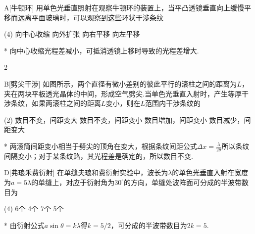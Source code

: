 \begin{choice}{A}[牛顿环]
    用单色光垂直照射在观察牛顿环的装置上，当平凸透镜垂直向上缓慢平移而远离平面玻璃时，可以观察到这些环状干涉条纹
    \begin{tasks}(4)
        \task 向中心收缩
        \task 向外扩张
        \task 向右平移
        \task 向左平移
    \end{tasks}
\end{choice}
\begin{solution}*
    向中心收缩光程差减小，可抵消透镜上移时导致的光程差增大.
\end{solution}

\begin{paracol}{2}
    \begin{choice}{B}[劈尖干涉]
        如图所示，两个直径有微小差别的彼此平行的滚柱之间的距离为$L$，夹在两块平板透光晶体的中间，形成空气劈尖.当单色光垂直入射时，产生等厚干涉条纹，如果两滚柱之间的距离$L$变小，则在$L$范围内干涉条纹的
        \begin{tasks}(2)
            \task 数目不变，间距变大
            \task 数目不变，间距变小
            \task 数目增加，间距变小
            \task 数目减少，间距变大
        \end{tasks}
    \end{choice}
    \switchcolumn\centering
    \vfill
    \vfill
\end{paracol}
\begin{solution}*
    两滚筒间距变小相当于劈尖的顶角在变大，根据条纹间距公式$\Delta x=\frac{\lambda}{2\theta}$所以条纹间隔变小；对于某条纹路，其光程差是确定的，所以数目不变.
\end{solution}

\begin{choice}{D}[弗琅禾费衍射]
    在单缝夫琅和费衍射实验中，波长为$\lambda$的单色光垂直入射在宽度为$a=5\lambda$的单缝上，对应于衍射角为$30^{\circ}$的方向，单缝处波阵面可分成的半波带数目为
    \begin{tasks}(4)
        \task 6个
        \task 4个
        \task 7个
        \task 5个
    \end{tasks}
\end{choice}
\begin{solution}*
    由衍射公式$a\sin{\theta}=k\lambda$得$k=5/2$，可分成的半波带数目为$2k=5$.
\end{solution}

